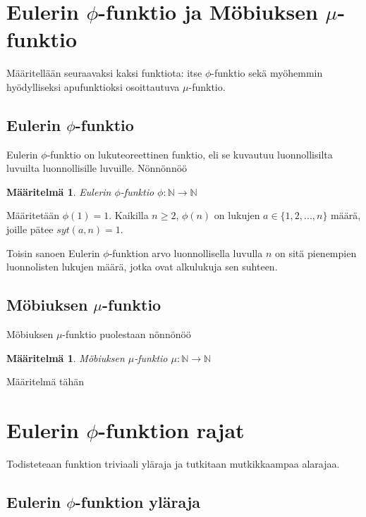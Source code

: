 \documentclass{article}
\theoremstyle{definition}
\newtheorem{maaritelma}[subsection]{Määritelmä}
\begin{document}
\section{Eulerin $\phi$-funktio ja Möbiuksen $\mu$-funktio}

Määritellään seuraavaksi kaksi funktiota: itse $\phi$-funktio sekä myöhemmin hyödylliseksi apufunktioksi osoittautuva $\mu$-funktio.

\subsection{Eulerin $\phi$-funktio}

Eulerin $\phi$-funktio on lukuteoreettinen funktio, eli se kuvautuu luonnollisilta luvuilta luonnollisille luvuille. Nönnönnöö

\begin{maaritelma}{\emph{Eulerin $\phi$-funktio $\phi: \mathbb{N} \rightarrow \mathbb{N}$}}

Määritetään $\phi(1) = 1$. Kaikilla $n \geq 2$, $\phi(n)$ on lukujen $a \in \{1,2,...,n\}$ määrä, joille pätee $syt(a,n) = 1$.

Toisin sanoen Eulerin $\phi$-funktion arvo luonnollisella luvulla $n$ on sitä pienempien luonnolisten lukujen määrä, jotka ovat alkulukuja sen suhteen.

\end{maaritelma}

\subsection{Möbiuksen $\mu$-funktio}

Möbiuksen $\mu$-funktio puolestaan nönnönöö

\begin{maaritelma}{\emph{Möbiuksen $\mu$-funktio $\mu: \mathbb{N} \rightarrow \mathbb{N}$}}

Määritelmä tähän

\end{maaritelma}

\section{Eulerin $\phi$-funktion rajat}

Todisteteaan funktion triviaali yläraja ja tutkitaan mutkikkaampaa alarajaa.

\subsection{Eulerin $\phi$-funktion yläraja}
\end{document}
